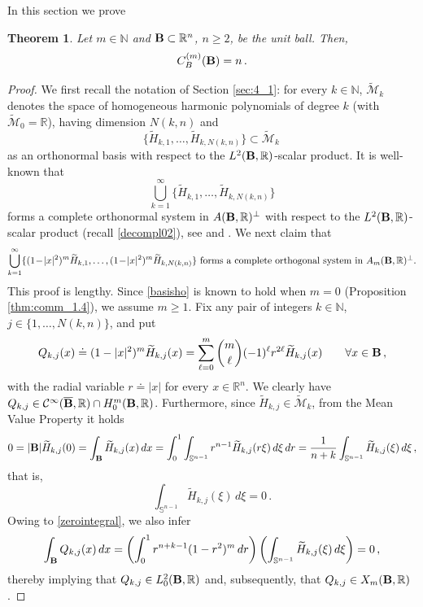 \documentclass[11pt]{article}
\newtheorem{theorem}{Theorem}[section]
\theoremstyle{plain}
\theoremstyle{definition}
\numberwithin{equation}{section}
\newcommand{\R}{\mathbb{R}}
\newcommand{\B}{{\bf B}}
\begin{document}
In this section we prove
	
\begin{theorem}\label{finalresult}
	Let $m \in \mathbb{N}$ and $\B \subset\R^n$, $n \geq 2$, be the unit ball. Then,
	\begin{equation}\label{finalresultn}
		C^{(m)}_{B}(\B) = n \, .
	\end{equation}
\end{theorem}
\noindent
\begin{proof}
We first recall the notation of Section \ref{sec:4_1}: for every  $k\in \mathbb{N}$, $\widetilde{\mathcal M}_k$ denotes the space of
homogeneous harmonic polynomials of degree $k$ (with $\widetilde{\mathcal M}_0=\R$), having dimension $N(k,n)$ and
$$
\{\widetilde{H}_{k,1},\ldots,\widetilde{H}_{k,N(k,n)}\} \subset \widetilde{\mathcal M}_k \,
$$
as an orthonormal basis with respect to the $L^2(\B, \mathbb{R})$-scalar product. It is well-known that
$$
\bigcup_{k=1}^\infty \{\widetilde{H}_{k,1},\ldots,\widetilde{H}_{k,N(k,n)}\}
$$
forms a complete orthonormal system in $A(\B, \mathbb{R})^{\perp}$ with respect to the $L^2(\B, \mathbb{R})$-scalar product (recall \eqref{decompl02}), see \cite[Proposition 4]{gaultier1992quelques} and \cite[Theorem 5.5.III,  Proposition 5.5.7]{Sauvigny_PDE_1}. We next claim that
\begin{equation} \label{basisho}
\bigcup_{k=1}^\infty \{(1\!-\!|x|^{2})^{m} \widetilde{H}_{k,1},\ldots,(1\!-\!|x|^{2})^{m} \widetilde{H}_{k,N(k,n)}\}\mbox{ forms a complete orthogonal system in $A_{m}(\B, \mathbb{R})^{\perp}$.}
\end{equation}
This proof is lengthy. Since \eqref{basisho} is known to hold when $m=0$ (Proposition \ref{thm:comm_1.4}), we assume $m \geq 1$.
Fix any pair of integers $k \in \mathbb{N}$, $j \in \{1,\ldots,N(k,n)\}$, and put
$$
Q_{k,j}(x) \doteq (1 - |x|^{2})^{m} \widetilde{H}_{k,j}(x) = \sum_{\ell=0}^{m} {m \choose \ell} (-1)^{\ell} r^{2\ell} \widetilde{H}_{k,j}(x) \qquad \forall x \in \B \, ,
$$
with the radial variable $r \doteq |x|$ for every $x \in \mathbb{R}^{n}$. We clearly have $Q_{k,j} \in \mathcal{C}^{\infty}(\overline{\B}, \mathbb{R}) \cap H_{0}^{m}(\B, \mathbb{R})$. Furthermore, since $\widetilde{H}_{k,j} \in \widetilde{\mathcal M}_k$, from the Mean Value Property it holds
$$
0 = | \B | \widetilde{H}_{k,j}(0) =\int_{\B} \widetilde{H}_{k,j}(x) \, dx = \int_{0}^{1} \int_{\mathbb{S}^{n-1}} r^{n-1} \widetilde{H}_{k,j}(r \xi) \, d\xi \, dr = \dfrac{1}{n+k} \int_{\mathbb{S}^{n-1}} \widetilde{H}_{k,j}(\xi) \, d\xi \, ,
$$
that is,
\begin{equation} \label{zerointegral}
\int_{\mathbb{S}^{n-1}} \widetilde{H}_{k,j}(\xi) \, d\xi = 0 \, .
\end{equation}
Owing to \eqref{zerointegral}, we also infer
$$
\int_{\B} Q_{k,j}(x) \, dx = \left( \int_{0}^{1} r^{n+k-1} (1 - r^{2})^{m} \, dr \right) \left( \int_{\mathbb{S}^{n-1}} \widetilde{H}_{k,j}(\xi) \, d\xi \right) = 0 \, ,
$$
thereby implying that $Q_{k,j} \in L_{0}^{2}(\B, \mathbb{R})$ and, subsequently, that $Q_{k,j} \in X_{m}(\B, \mathbb{R})$.


\end{proof}
\end{document}

